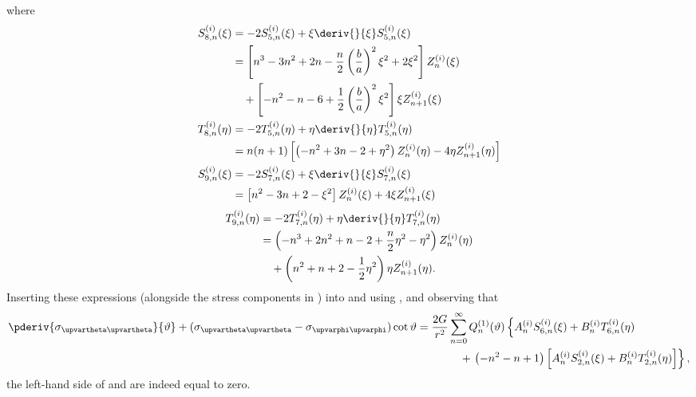 where
\begin{align*}
	S_{8,n}^{(i)}(\xi) &= -2S_{5,n}^{(i)}(\xi) + \xi \deriv{}{\xi}S_{5,n}^{(i)}(\xi) \\
	&= \left[n^3-3n^2+2n-\frac{n}{2}\left(\frac{b}{a}\right)^2\xi^2 + 2\xi^2\right]Z_n^{(i)}(\xi)\\ 
	&{\hskip1em\relax} + \left[-n^2-n-6+\frac{1}{2}\left(\frac{b}{a}\right)^2\xi^2\right]\xi Z_{n+1}^{(i)}(\xi)\\
	T_{8,n}^{(i)}(\eta) &= -2T_{5,n}^{(i)}(\eta) + \eta \deriv{}{\eta}T_{5,n}^{(i)}(\eta) \\
	&= n(n+1)\left[\left(-n^2+3n-2+\eta^2\right)Z_n^{(i)}(\eta) - 4\eta Z_{n+1}^{(i)}(\eta)\right]\\
	S_{9,n}^{(i)}(\xi) &= -2S_{7,n}^{(i)}(\xi) + \xi \deriv{}{\xi}S_{7,n}^{(i)}(\xi) \\
	&= \left[n^2-3n+2-\xi^2\right]Z_n^{(i)}(\xi) + 4\xi Z_{n+1}^{(i)}(\xi) \\
\end{align*}
\begin{align*}
	T_{9,n}^{(i)}(\eta) &= -2T_{7,n}^{(i)}(\eta) + \eta \deriv{}{\eta}T_{7,n}^{(i)}(\eta) \\
	&= \left(-n^3+2n^2+n-2+\frac{n}{2}\eta^2-\eta^2\right)Z_n^{(i)}(\eta)\\ 
	&{\hskip1em\relax} +\left(n^2+n+2-\frac{1}{2}\eta^2\right)\eta Z_{n+1}^{(i)}(\eta).
\end{align*}
Inserting these expressions (alongside the stress components in ) into  and using , and observing that
\begin{align*}
	\pderiv{\sigma_{\upvartheta\upvartheta}}{\vartheta} +(\sigma_{\upvartheta\upvartheta} - \sigma_{\upvarphi\upvarphi})\cot\vartheta= \frac{2G}{r^2}&\sum_{n=0}^\infty  Q_n^{(1)}(\vartheta)\left\{A_n^{(i)} S_{6,n}^{(i)}(\xi) + B_n^{(i)} T_{6,n}^{(i)}(\eta)\right. \\
	&{\hskip1em\relax}+\left. \left(-n^2-n+1\right)\left[A_n^{(i)} S_{2,n}^{(i)}(\xi) + B_n^{(i)} T_{2,n}^{(i)}(\eta)\right]\right\},
\end{align*}
the left-hand side of  and  are indeed equal to zero.
